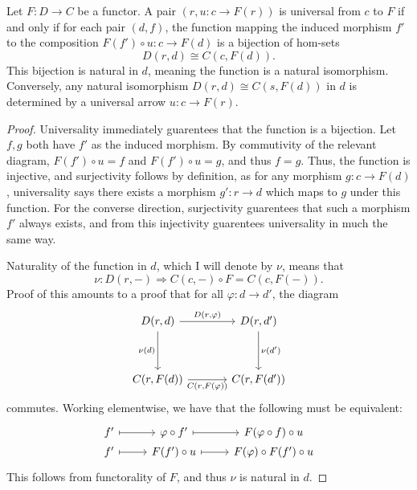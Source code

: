 \begin{proposition}\label{prp:3.1}
	Let $F : D \to C$ be a functor. A pair $(r,u : c \to F(r))$ is universal from $c$ to $F$ if and only if for each pair $(d,f)$, the function mapping the induced morphism $f'$ to the composition $F(f')\circ u : c \to F(d)$ is a bijection of hom-sets
	\[
		D(r,d)\cong C(c,F(d))
	.\]
	This bijection is natural in $d$, meaning the function is a natural isomorphism. Conversely, any natural isomorphism $D(r,d)\cong C(s,F(d))$ in $d$ is determined by a universal arrow $u : c \to F(r)$.
\end{proposition}
\begin{proof}
	Universality immediately guarentees that the function is a bijection. Let $f,g$ both have $f'$ as the induced morphism. By commutivity of the relevant diagram, $F(f')\circ u=f$ and $F(f')\circ u=g$, and thus $f=g$. Thus, the function is injective, and surjectivity follows by definition, as for any morphism $g : c \to F(d)$, universality says there exists a morphism $g': r \to d$ which maps to $g$ under this function. For the converse direction, surjectivity guarentees that such a morphism $f'$ always exists, and from this injectivity guarentees universality in much the same way.

	Naturality of the function in $d$, which I will denote by $\nu $, means that
	\[
		\nu : D(r,-) \Rightarrow C(c,-)\circ F=C(c,F(-))
	.\]
	Proof of this amounts to a proof that for all $\varphi : d \to d'$, the diagram
	\[\begin{tikzcd}[row sep = 3.5em, column sep = 3.5em]
	D(r,d)\ar[" D(r\text{,}\varphi ) ", r] \ar[" \nu (d) "', d]  & D(r,d')\ar[" \nu (d') ", d]  \\
	C(r,F(d))\ar[" C(r\text{,}F(\varphi )) "', r]  & C(r,F(d'))
	\end{tikzcd}\]
	commutes. Working elementwise, we have that the following must be equivalent:
	\[\begin{tikzcd}[row sep = 0em, column sep = 2.5em]
	f'\ar[mapsto, r]  & \varphi \circ f'\ar[mapsto, r]  & F(\varphi \circ f)\circ u \\
	f'\ar[mapsto, r]  & F(f')\circ u\ar[mapsto, r]  & F(\varphi ) \circ F(f')\circ u
	\end{tikzcd}\]
	This follows from functorality of $F$, and thus $\nu $ is natural in $d$.


\end{proof}
